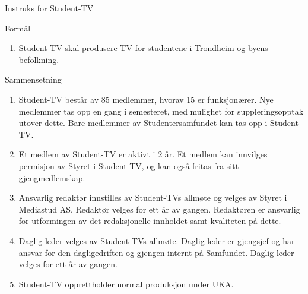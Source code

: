 \documentclass[../fsbok.tex]{subfiles}
\begin{document}
\begin{instruks*}{Instruks for Student-TV}

    \begin{instruksledd}{Formål}
        \begin{enumerate}
            \item Student-TV skal produsere TV for studentene i Trondheim og byens befolkning.
        \end{enumerate}
    \end{instruksledd}

    \begin{instruksledd}{Sammensetning}
        \begin{enumerate}
            \item Student-TV består av 85 medlemmer, hvorav 15 er funksjonærer. Nye medlemmer tas
                opp en gang i semesteret, med mulighet for suppleringsopptak utover dette. Bare medlemmer av
                Studentersamfundet kan tas opp i Student-TV.
            \item Et medlem av Student-TV er aktivt i 2 år. Et medlem kan innvilges permisjon av
                Styret i Student-TV, og kan også fritas fra sitt gjengmedlemskap.
            \item Ansvarlig redaktør innstilles av Student-TVs allmøte og velges av Styret i
                Mediastud AS. Redaktør velges for ett år av gangen. Redaktøren er ansvarlig for utformingen av det
                redaksjonelle innholdet samt kvaliteten på dette.
            \item Daglig leder velges av Student-TVs allmøte. Daglig leder er gjengsjef og
                har ansvar for den dagligedriften og gjengen internt på Samfundet. Daglig leder velges for ett år av
                gangen.
            \item Student-TV opprettholder normal produksjon under UKA.
        \end{enumerate}
    \end{instruksledd}


\end{instruks*}
\end{document}

